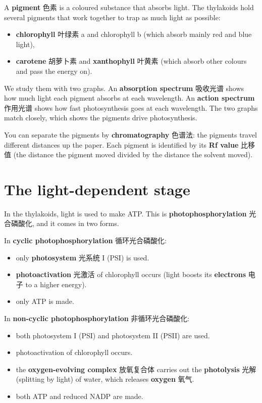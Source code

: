 \documentclass[11pt]{article}
\begin{document}
A \textbf{pigment} 色素 is a coloured substance that absorbs light. The thylakoids hold several pigments that work together to trap as much light as possible:

\begin{itemize}
\item \textbf{chlorophyll} 叶绿素 a and chlorophyll b (which absorb mainly red and blue light),

\item \textbf{carotene} 胡萝卜素 and \textbf{xanthophyll} 叶黄素 (which absorb other colours and pass the energy on).

\end{itemize}

We study them with two graphs. An \textbf{absorption spectrum} 吸收光谱 shows how much light each pigment absorbs at each wavelength. An \textbf{action spectrum} 作用光谱 shows how fast photosynthesis goes at each wavelength. The two graphs match closely, which shows the pigments drive photosynthesis.

You can separate the pigments by \textbf{chromatography} 色谱法: the pigments travel different distances up the paper. Each pigment is identified by its \textbf{Rf value} 比移值 (the distance the pigment moved divided by the distance the solvent moved).

\section*{The light-dependent stage}

In the thylakoids, light is used to make ATP. This is \textbf{photophosphorylation} 光合磷酸化, and it comes in two forms.

In \textbf{cyclic photophosphorylation} 循环光合磷酸化:

\begin{itemize}
\item only \textbf{photosystem} 光系统 I (PSI) is used.

\item \textbf{photoactivation} 光激活 of chlorophyll occurs (light boosts its \textbf{electrons} 电子 to a higher energy).

\item only ATP is made.

\end{itemize}

In \textbf{non-cyclic photophosphorylation} 非循环光合磷酸化:

\begin{itemize}
\item both photosystem I (PSI) and photosystem II (PSII) are used.

\item photoactivation of chlorophyll occurs.

\item the \textbf{oxygen-evolving complex} 放氧复合体 carries out the \textbf{photolysis} 光解 (splitting by light) of water, which releases \textbf{oxygen} 氧气.

\item both ATP and reduced NADP are made.

\end{itemize}
\end{document}
